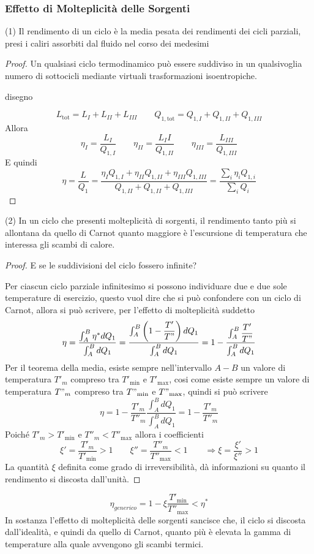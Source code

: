 \subsubsection{Effetto di Molteplicità delle Sorgenti}
\begin{adjustwidth}{2in}{}
	\begin{en}(1)
		Il rendimento di un ciclo è la media pesata dei rendimenti dei cicli parziali, presi i caliri assorbiti dal fluido nel corso dei medesimi
	\end{en}
	
	\begin{proof}
		Un qualsiasi ciclo termodinamico può essere suddiviso in un qualsivoglia numero di sottocicli mediante virtuali trasformazioni isoentropiche. 
		
		disegno
		
		\[L_\text{tot} = L_I + L_{II} + L_{III}\qquad Q_{1,\text{tot}} = Q_{1,I} + Q_{1,II} + Q_{1,III}\]
		Allora 
		\[\eta_I = \dfrac{L_I}{ Q_{1,I}} \qquad \eta_{II} = \dfrac{L_II}{ Q_{1,II}} \qquad \eta_{III} = \dfrac{L_{III}}{ Q_{1,III}}\]
		E quindi
		\[\eta=\dfrac{L}{Q_1} = \dfrac{\eta_{I} Q_{1,I} + \eta_{II} Q_{1,II} + \eta_{III} Q_{1,III} }{Q_{1,II} + Q_{1,II} + Q_{1,III}} = \dfrac{\sum_i\eta_iQ_{1,i}}{\sum_iQ_i}\]
	\end{proof}
	\begin{en}(2)
		In un ciclo che presenti molteplicità di sorgenti, il rendimento tanto più si allontana da quello di Carnot quanto maggiore è l'escursione di temperatura che interessa gli scambi di calore.
	\end{en} 
	
	\begin{proof}
		E se le suddivisioni del ciclo fossero infinite? 
		
		Per ciascun ciclo parziale infinitesimo si possono individuare due e due sole temperature di esercizio, questo vuol dire che si può confondere con un ciclo di Carnot, allora si può scrivere, per l'effetto di molteplicità suddetto
		\[\eta=\dfrac{\int_{A}^{B}\eta^*dQ_1}{\int_{A}^{B}dQ_1} = \dfrac{\int_{A}^{B}\left(1 - \dfrac{T'}{T"}\right)dQ_1}{\int_{A}^{B}dQ_1} = 1 - \dfrac{\int_{A}^{B}\dfrac{T'}{T"}}{\int_{A}^{B}dQ_1}\]
		Per il teorema della media, esiste sempre nell'intervallo $A-B$ un valore di temperatura $T'_m$ compreso tra $T'_{\min}$ e $T'_{\max}$, cosi come esiste sempre un valore di temperatura $T"_m$ compreso tra $T"_{\min}$ e $T"_{\max}$, quindi si può scrivere 
		\[\eta=1-\dfrac{T'_m}{T''_m}\dfrac{\int_{A}^{B}dQ_1}{\int_{A}^{B}dQ_1} = 1-\dfrac{T'_m}{T''_m}\]
		Poiché $T'_m>T'_{\min}$ e $T''_m<T''_{\max}$ allora i coefficienti
		\[\xi'=\dfrac{T'_m}{T'_{\min}}>1\qquad \xi''=\dfrac{T''_m}{T''_{\max}}<1 \qquad\Rightarrow \xi = \dfrac{\xi'}{\xi''}>1\]
		La quantità $\xi$ definita come grado di irreversibilità, dà informazioni su quanto il rendimento si discosta dall'unità. 
	\end{proof}
	\[\eta_{generico} = 1-\xi\dfrac{T'_{\min}}{T''_{\max}}<\eta^*\]
	In sostanza l'effetto di molteplicità delle sorgenti sancisce che, il ciclo si discosta dall'idealità, e quindi da quello di Carnot, quanto più è elevata la gamma di temperature alla quale avvengono gli scambi termici. \newline
	

\end{adjustwidth}
